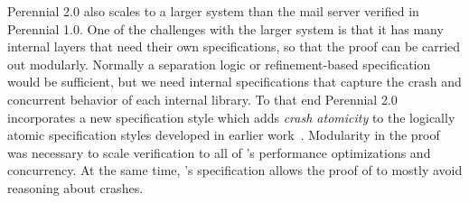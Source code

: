 Perennial 2.0 also scales to a larger system than the mail server verified in
Perennial 1.0. One of the challenges with the larger system is that it has many
internal layers that need their own specifications, so that the proof can be
carried out modularly. Normally a separation logic or refinement-based
specification would be sufficient, but we need internal specifications that capture
the crash and concurrent behavior of each internal library. To that end
Perennial 2.0 incorporates a new specification style which adds \emph{crash
atomicity} to the logically atomic specification styles developed in earlier
work~\citep{jacobs:logatom,svendsen:hocap,pinto:tada}. Modularity in the proof
was necessary to scale verification to
all of \txn's performance optimizations and concurrency.
At the same time, \txn's specification allows
the proof of \simplenfs to mostly avoid reasoning about crashes.





